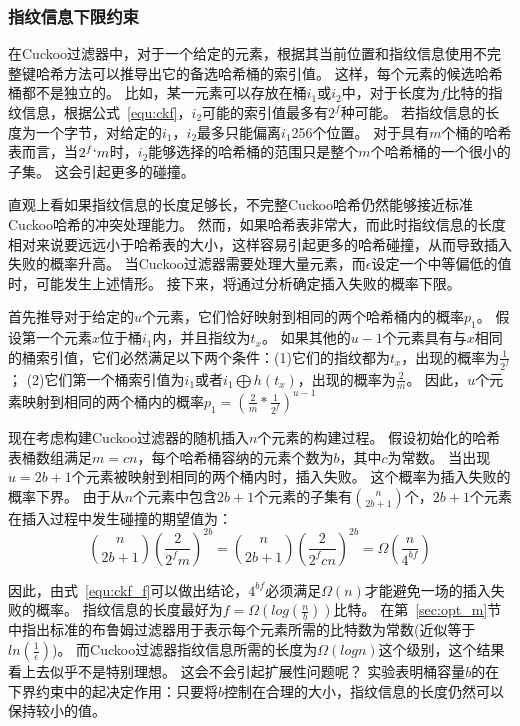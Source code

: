 \subsubsection{指纹信息下限约束}
在Cuckoo过滤器中，对于一个给定的元素，根据其当前位置和指纹信息使用不完整键哈希方法可以推导出它的备选哈希桶的索引值。
这样，每个元素的候选哈希桶都不是独立的。
比如，某一元素可以存放在桶$i_1$或$i_2$中，对于长度为$f$比特的指纹信息，根据公式~\ref{equ:ckf}，$i_2$可能的索引值最多有$2^f$种可能。
若指纹信息的长度为一个字节，对给定的$i_1$，$i_2$最多只能偏离$i_1$256个位置。
对于具有$m$个桶的哈希表而言，当$2^f \lq m$时，$i_2$能够选择的哈希桶的范围只是整个$m$个哈希桶的一个很小的子集。
这会引起更多的碰撞。

直观上看如果指纹信息的长度足够长，不完整Cuckoo哈希仍然能够接近标准Cuckoo哈希的冲突处理能力。
然而，如果哈希表非常大，而此时指纹信息的长度相对来说要远远小于哈希表的大小，这样容易引起更多的哈希碰撞，从而导致插入失败的概率升高。
当Cuckoo过滤器需要处理大量元素，而$\epsilon$设定一个中等偏低的值时，可能发生上述情形。
接下来，将通过分析确定插入失败的概率下限。

首先推导对于给定的$u$个元素，它们恰好映射到相同的两个哈希桶内的概率$p_1$。
假设第一个元素$x$位于桶$i_1$内，并且指纹为$t_x$。
如果其他的$u-1$个元素具有与$x$相同的桶索引值，它们必然满足以下两个条件：(1)它们的指纹都为$t_x$，出现的概率为$\frac{1}{2^f}$；
(2)它们第一个桶索引值为$i_1$或者$i_1 \bigoplus h(t_x)$，出现的概率为$\frac{2}{m}$。
因此，$u$个元素映射到相同的两个桶内的概率$p_1 = (\frac{2}{m}\ast \frac{1}{2^f})^{u-1}$

现在考虑构建Cuckoo过滤器的随机插入$n$个元素的构建过程。
假设初始化的哈希表桶数组满足$m = cn$，每个哈希桶容纳的元素个数为$b$，其中$c$为常数。
当出现$u = 2b+1$个元素被映射到相同的两个桶内时，插入失败。
这个概率为插入失败的概率下界。
由于从$n$个元素中包含$2b+1$个元素的子集有$\binom{n}{2b+1}$个，$2b+1$个元素在插入过程中发生碰撞的期望值为：
\begin{equation}
\binom{n}{2b+1}(\frac{2}{2^fm})^{2b} = \binom{n}{2b+1}(\frac{2}{2^f{cn}})^{2b} = \Omega(\frac{n}{4^{bf}}) 
\label{equ:ckf_f}
\end{equation}

因此，由式~\ref{equ:ckf_f}可以做出结论，$4^{bf}$必须满足$\Omega(n)$才能避免一场的插入失败的概率。
指纹信息的长度最好为$f = \Omega(log(\frac{n}{b}))$比特。
在第~\ref{sec:opt_m}节中指出标准的布鲁姆过滤器用于表示每个元素所需的比特数为常数(近似等于$ln(\frac{1}{\epsilon})$)。
而Cuckoo过滤器指纹信息所需的长度为$\Omega(logn)$这个级别，这个结果看上去似乎不是特别理想。
这会不会引起扩展性问题呢？
实验表明桶容量$b$的在下界约束中的起决定作用：只要将$b$控制在合理的大小，指纹信息的长度仍然可以保持较小的值。

